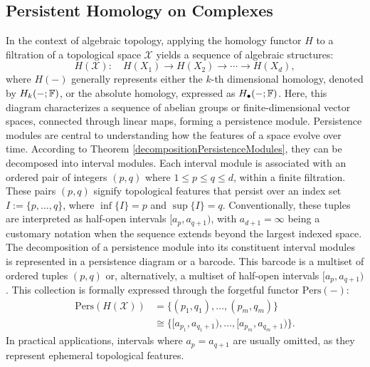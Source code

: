 \subsection{Persistent Homology on Complexes}
\label{PersistentHomologyonComplexes}
In the context of algebraic topology, applying the homology functor $H$
to a filtration of a topological space $\mathcal{X}$ yields a sequence of algebraic structures:
\begin{equation}
	H(\mathcal{X}): \quad H(X_{1}) \to H(X_{2}) \to \cdots
	\to H(X_{d}),
\end{equation}
where $H(-)$ generally represents either the $k$-th dimensional
homology, denoted by $H_{k}(-;{\mathbb{F}})$, or the absolute homology, expressed as $H
_{\bullet}(-;{\mathbb{F}})$. Here, this diagram characterizes a sequence of abelian
groups or finite-dimensional vector spaces, connected through linear maps, forming a persistence module. Persistence modules are central to understanding how the features of a space evolve
over time. According to Theorem \ref{decompositionPersistenceModules}, they can be decomposed into interval modules. Each interval module is associated with an
ordered pair of integers $(p,q)$ where $1 \leq p \leq q \leq d$, within a finite
filtration. These pairs $(p,q)$ signify topological features that persist over an
index set $I := \{p, \ldots, q\}$, where $\inf\{I\} = p$ and $\sup\{I\} = q$. Conventionally,
these tuples are interpreted as half-open intervals $[a_{p}, a_{q+1})$, with $a_{d+1}
= \infty$ being a customary notation when the sequence extends beyond the largest
indexed space. The decomposition of a persistence module into its constituent interval modules is
represented in a persistence diagram or a barcode. This barcode is a multiset of ordered tuples $(p,q)$ or, alternatively, a multiset
of half-open intervals $[a_{p}, a_{q+1})$. This collection is formally expressed
through the forgetful functor $\mathrm{Pers}(-)$:
\begin{align}
    \mathrm{Pers}(H(\mathcal{X})) & = \{(p_{1},q_{1}), \ldots, (p_{m},q_{m})\}                    \\
                                           & \cong \{[a_{p_1}, a_{q_1+1}), \ldots, [a_{p_m}, a_{q_m+1})\}.
\end{align}
In practical applications, intervals where $a_{p} = a_{q+1}$ are usually omitted,
as they represent ephemeral topological features.

